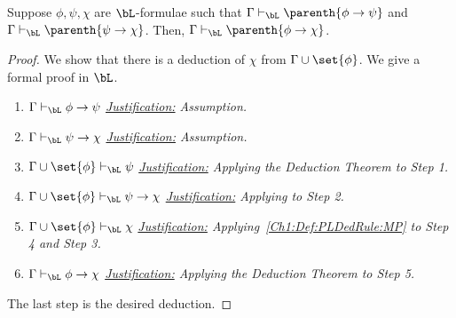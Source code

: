 \begin{boxcorollary}
    Suppose $\phi, \psi, \chi$ are $\bL$-formulae such that $\Gamma \vdash_{\bL} \parenth{\phi \to \psi}$ and $\Gamma \vdash_{\bL} \parenth{\psi \to \chi}$. Then, $\Gamma \vdash_{\bL} \parenth{\phi \to \chi}$.
\end{boxcorollary}
\begin{proof}
    We show that there is a deduction of $\chi$ from $\Gamma \cup \set{\phi}$. We give a formal proof in $\bL$.

    \begin{enumerate}
        \item $\Gamma \vdash_{\bL} \phi \to \psi$
        \newline
        \textit{\underline{Justification:}
            Assumption.
        }

        \item $\Gamma \vdash_{\bL} \psi \to \chi$
        \newline
        \textit{\underline{Justification:}
            Assumption.
        }

        \item $\Gamma \cup \set{\phi} \vdash_{\bL} \psi$
        \newline
        \textit{\underline{Justification:}
            Applying the Deduction Theorem to Step 1.
        }

        \item $\Gamma \cup \set{\phi} \vdash_{\bL} \psi \to \chi$
        \newline
        \textit{\underline{Justification:}
            Applying  to Step 2.
        }

        \item $\Gamma \cup \set{\phi} \vdash_{\bL} \chi$
        \newline
        \textit{\underline{Justification:}
            Applying~\ref{Ch1:Def:PLDedRule:MP} to Step 4 and Step 3.
        }

        \item $\Gamma \vdash_{\bL} \phi \to \chi$
        \newline
        \textit{\underline{Justification:}
            Applying the Deduction Theorem to Step 5.
        }
    \end{enumerate}
    The last step is the desired deduction.
\end{proof}

